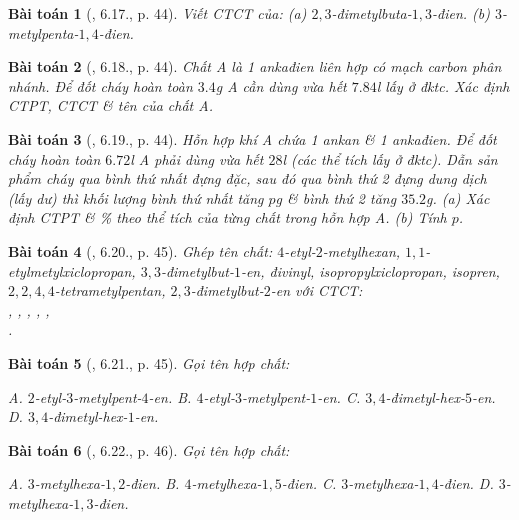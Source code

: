 \documentclass{article}
\newtheorem{baitoan}{Bài toán}
\begin{document}
\begin{baitoan}[\cite{SBT_Hoa_Hoc_11_co_ban}, 6.17., p. 44]
	Viết CTCT của: (a) $2,3$-đimetylbuta-$1,3$-đien. (b) $3$-metylpenta-$1,4$-đien.
\end{baitoan}

\begin{baitoan}[\cite{SBT_Hoa_Hoc_11_co_ban}, 6.18., p. 44]
	Chất A là 1 ankađien liên hợp có mạch carbon phân nhánh. Để đốt cháy hoàn toàn $3.4$\emph{g} A cần dùng vừa hết $7.84$\emph{l} \emph{} lấy ở đktc. Xác định CTPT, CTCT \& tên của chất A.
\end{baitoan}

\begin{baitoan}[\cite{SBT_Hoa_Hoc_11_co_ban}, 6.19., p. 44]
	Hỗn hợp khí A chứa 1 ankan \& 1 ankađien. Để đốt cháy hoàn toàn $6.72$\emph{l} A phải dùng vừa hết $28$\emph{l} \emph{} (các thể tích lấy ở đktc). Dẫn sản phẩm cháy qua bình thứ nhất đựng \emph{} đặc, sau đó qua bình thứ 2 đựng dung dịch \emph{} (lấy dư) thì khối lượng bình thứ nhất tăng $p$\emph{g} \& bình thứ 2 tăng $35.2$\emph{g}. (a) Xác định CTPT \& \% theo thể tích của từng chất trong hỗn hợp A. (b) Tính $p$.
\end{baitoan}

\begin{baitoan}[\cite{SBT_Hoa_Hoc_11_co_ban}, 6.20., p. 45]
	Ghép tên chất: $4$-etyl-$2$-metylhexan, $1,1$-etylmetylxiclopropan, $3,3$-đimetylbut-$1$-en, đivinyl, isopropylxiclopropan, isopren, $2,2,4,4$-tetrametylpentan, $2,3$-đimetylbut-$2$-en với CTCT:\\\emph{,  , , , },\\\emph{}.
\end{baitoan}

\begin{baitoan}[\cite{SBT_Hoa_Hoc_11_co_ban}, 6.21., p. 45]
	Gọi tên hợp chất:
	\begin{center}
	\end{center}
	{\sf A.} $2$-etyl-$3$-metylpent-$4$-en. {\sf B.} $4$-etyl-$3$-metylpent-$1$-en. {\sf C.} $3,4$-đimetyl-hex-$5$-en. {\sf D.} $3,4$-đimetyl-hex-$1$-en.
\end{baitoan}

\begin{baitoan}[\cite{SBT_Hoa_Hoc_11_co_ban}, 6.22., p. 46]
	Gọi tên hợp chất:
	\begin{center}
	\end{center}
	{\sf A.} $3$-metylhexa-$1,2$-đien. {\sf B.} $4$-metylhexa-$1,5$-đien. {\sf C.} $3$-metylhexa-$1,4$-đien. {\sf D.} $3$-metylhexa-$1,3$-đien.
\end{baitoan}
\end{document}
